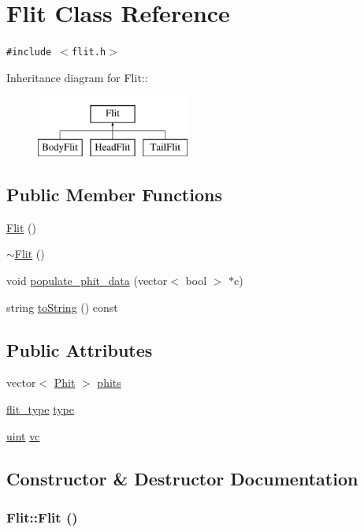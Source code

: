 \hypertarget{classFlit}{
\section{Flit Class Reference}
\label{classFlit}
}
{\tt \#include $<$flit.h$>$}

Inheritance diagram for Flit::\begin{figure}[H]
\begin{center}
\leavevmode
\includegraphics[height=2cm]{classFlit}
\end{center}
\end{figure}
\subsection*{Public Member Functions}
\begin{CompactItemize}
\item 
\hyperlink{classFlit_feebd85e6d981855d5405e163cb64f63}{Flit} ()
\item 
\hyperlink{classFlit_6c188313705a19f7fa7dffabb6591ceb}{$\sim$Flit} ()
\item 
void \hyperlink{classFlit_c290470e490b600742672da65d4b42f0}{populate\_\-phit\_\-data} (vector$<$ bool $>$ $\ast$c)
\item 
string \hyperlink{classFlit_ffc6c729a005389b51818aac59710dab}{toString} () const 
\end{CompactItemize}
\subsection*{Public Attributes}
\begin{CompactItemize}
\item 
vector$<$ \hyperlink{classPhit}{Phit} $>$ \hyperlink{classFlit_8f86afda1dc9b2393655bbabf7ebf42a}{phits}
\item 
\hyperlink{flit_8h_2c6c8cfc6307d086e578093535798328}{flit\_\-type} \hyperlink{classFlit_1a9a073876b8ac18b92e2b1b0eff33d7}{type}
\item 
\hyperlink{outputBuffer_8h_91ad9478d81a7aaf2593e8d9c3d06a14}{uint} \hyperlink{classFlit_784536ac677ec8b4f2924bd91fbfa4c2}{vc}
\end{CompactItemize}


\subsection{Constructor \& Destructor Documentation}
\hypertarget{classFlit_feebd85e6d981855d5405e163cb64f63}{
\subsubsection[{Flit}]{\setlength{\rightskip}{0pt plus 5cm}Flit::Flit ()}}
\label{classFlit_feebd85e6d981855d5405e163cb64f63}


